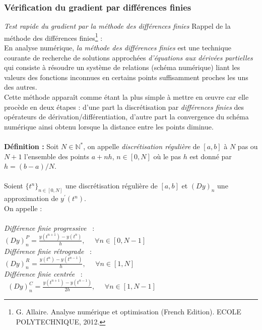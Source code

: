 \documentclass{article}
\begin{document}
\subsubsection{Vérification du gradient par différences finies}
\textit{Test rapide du gradient par la méthode des différences finies}
Rappel de la méthode des différences finies\footnote{

G. Allaire. Analyse numérique et optimisation (French Edition). ECOLE POLYTECHNIQUE, 2012.} :\\
En analyse numérique, \textit{la méthode des différences finies} est une technique courante de recherche de solutions approchées \textit{d'équations aux dérivées partielles} qui consiste à résoudre un système de relations (schéma numérique) liant les valeurs des fonctions inconnues en certains points suffisamment proches les uns des autres.\\

Cette méthode apparaît comme étant la plus simple à mettre en œuvre car elle procède en deux étapes : d'une part la discrétisation par \textit{différences finies} des opérateurs de dérivation/différentiation, d'autre part la convergence du schéma numérique ainsi obtenu lorsque la distance entre les points diminue.\\
$ $\\
\textbf{Définition :}
Soit $N\in\mathds{N^{*}}$, on appelle \textit{discrétisation régulière} de $[a,b]$ à $N$ pas ou $N+1$ l'ensemble des points $a+nh$, $n\in[0,N]$ o\`{u} le pas $h$ est donné par$h=(b-a)/N$.\\
$ $\\
Soient $\{t^{n}\}_{n\in[0,N]}$ une discrétisation régulière de $[a, b]$ et $(Dy)_{n}$ une approximation de $y^{'}(t^{n})$.\\
On appelle :\\
$ $\\
\bullet \textit{Différence finie progressive}~ :\\

  $(Dy)_{n}^{P}=\frac{y(t^{n+1})-y(t^{n})}{h}, ~~~~~~ \forall n \in [0,N-1]$\\


\bullet \textit{Différence finie rétrograde}~ :\\

  $(Dy)_{n}^{R}=\frac{y(t^{n})-y(t^{n-1})}{h}, ~~~~~~ \forall n \in [1,N]$\\


\bullet \textit{Différence finie centrée}~ :\\
\
  $(Dy)_{n}^{C}=\frac{y(t^{n+1})-y(t^{n-1})}{2h}, ~~~~~~ \forall n \in [1,N-1]$
\end{document}
